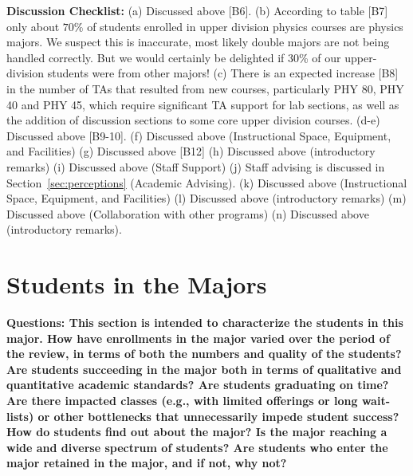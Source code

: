 \documentclass[12pt]{article}
\begin{document}
\noindent
{\bf Discussion Checklist:} (a) Discussed above [B6].  (b) According
to table [B7] only about $70\%$ of students enrolled in upper division
physics courses are physics majors.  We suspect this is inaccurate,
most likely double majors are not being handled correctly.  But we
would certainly be delighted if 30\% of our upper-division students
were from other majors! (c) There is an expected increase [B8] in the
number of TAs that resulted from new courses, particularly PHY 80, PHY
40 and PHY 45, which require significant TA support for lab sections,
as well as the addition of discussion sections to some core upper
division courses.  (d-e) Discussed above [B9-10]. (f) Discussed above
(Instructional Space, Equipment, and Facilities) (g) Discussed above
[B12] (h) Discussed above (introductory remarks) (i) Discussed above
(Staff Support) (j) Staff advising is discussed in
Section~\ref{sec:perceptions} (Academic Advising).  (k) Discussed
above (Instructional Space, Equipment, and Facilities) (l) Discussed
above (introductory remarks) (m) Discussed above (Collaboration with
other programs) (n) Discussed above (introductory remarks).

\newpage
\section{Students in the Majors}
\label{sec:students}

{\bf Questions: This section is intended to characterize the students
  in this major. How have enrollments in the major varied over the
  period of the review, in terms of both the numbers and quality of
  the students? Are students succeeding in the major both in terms of
  qualitative and quantitative academic standards? Are students
  graduating on time? Are there impacted classes (e.g., with limited
  offerings or long wait-lists) or other bottlenecks that
  unnecessarily impede student success? How do students find out about
  the major?  Is the major reaching a wide and diverse spectrum of
  students? Are students who enter the major retained in the major,
  and if not, why not?}\\[3pt]
\end{document}
